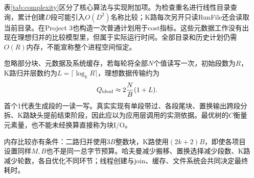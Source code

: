表\ref{tab:complexity}区分了核心算法与实现附加项。为检查重名进行线性目录查询，累计创建$D$段可能引入$O(D^2)$名称比较；K路每次另开只读RunFile还会读取当前目录。在Project 3也构造一次普通计划用于cost指标。这些元数据工作没有出现在理想归并的比较模型里，但属于实际运行时间。全部目录和历史计划仍需$O(R)$内存，不能宣称整个进程空间恒定。

忽略部分块、元数据及系统缓存，若每轮将全部$N$个值读写一次，初始段数为$R$，K路归并层数约为$L=\lceil\log_k R\rceil$，理想数据传输约为
\begin{equation}
Q_{\rm ideal}\approx 2\frac{N}{B}(1+L).
\end{equation}
首个1代表生成段的一读一写。真实实现有单段带过、各段尾块、置换输出跨段分拆、K路缺头提前结束阶段，因此应以为应用层调用的实测依据。最优树的$C$衡量元素量，也不能未经换算直接称为块I/O。

内存比较亦有条件：二路归并使用$3B$整数块，K路使用$(2k+2)B$，即使各项目设置同样$M,B$也不是同一总字节预算。哈夫曼减少搬移、置换选择减少段数、K路减少轮数，各自优化不同环节；线程创建与join、缓存、文件系统会共同决定最终耗时。
